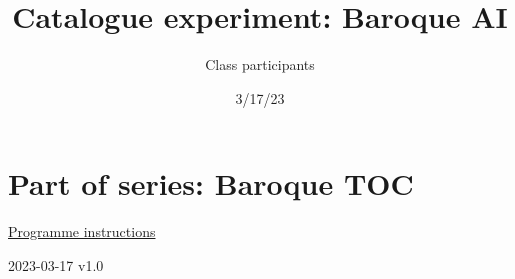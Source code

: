 \documentclass[
  letterpaper,
]{book}
\title{Catalogue experiment: Baroque AI}
\author{Class participants}
\date{3/17/23}
\renewcommand*\contentsname{Table of contents}
\newcommand\contentsname{Table of contents}
\begin{document}
\frontmatter
\maketitle
\ifdefined\Shaded\renewenvironment{Shaded}{\begin{tcolorbox}[boxrule=0pt, interior hidden, breakable, sharp corners, enhanced, borderline west={3pt}{0pt}{shadecolor}, frame hidden]}{\end{tcolorbox}}\fi

\renewcommand*\contentsname{Table of contents}
{
\setcounter{tocdepth}{2}
\tableofcontents
}
\mainmatter
{}

\hypertarget{part-of-series-baroque-toc}{%
\chapter{Part of series: Baroque TOC}\label{part-of-series-baroque-toc}}

\href{https://mrchristian.github.io/Workshop-Publishing-from-Collections/}{Programme
instructions}

2023-03-17 v1.0
\end{document}
